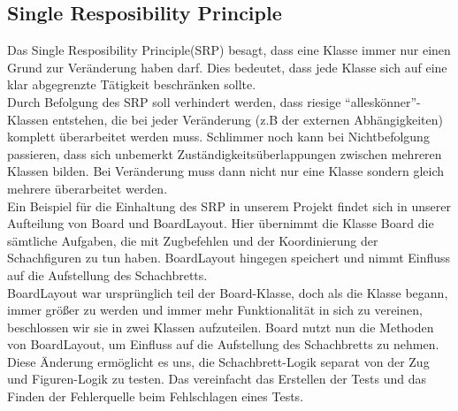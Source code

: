 \documentclass[
10pt, %
a4paper, %
oneside, %
headinclude,footinclude, %
BCOR5mm, %
]{scrartcl}
\begin{document}
\begin{onehalfspace}
\subsection{Single Resposibility Principle}
Das Single Resposibility Principle(SRP) besagt, dass eine Klasse immer nur einen Grund zur Veränderung haben darf. Dies bedeutet, dass jede Klasse sich auf eine klar abgegrenzte Tätigkeit beschränken sollte. 
\\
Durch Befolgung des SRP soll verhindert werden, dass riesige \enquote{alleskönner}-Klassen entstehen, die bei jeder Veränderung (z.B der externen Abhängigkeiten) komplett überarbeitet werden muss. Schlimmer noch kann bei Nichtbefolgung passieren, dass sich unbemerkt Zuständigkeitsüberlappungen zwischen mehreren Klassen bilden. Bei Veränderung muss dann nicht nur eine Klasse sondern gleich mehrere überarbeitet werden.
\\
Ein Beispiel für die Einhaltung des SRP in unserem Projekt findet sich in unserer Aufteilung von Board und BoardLayout. Hier übernimmt die Klasse Board die sämtliche Aufgaben, die mit Zugbefehlen und der Koordinierung der Schachfiguren zu tun haben. BoardLayout hingegen speichert und nimmt Einfluss auf die Aufstellung des Schachbretts.
\\
BoardLayout war ursprünglich teil der Board-Klasse, doch als die Klasse begann, immer größer zu werden und immer mehr Funktionalität in sich zu vereinen, beschlossen wir sie in zwei Klassen aufzuteilen.
Board nutzt nun die Methoden von BoardLayout, um Einfluss auf die Aufstellung des Schachbretts zu nehmen.
\\
Diese Änderung ermöglicht es uns, die Schachbrett-Logik separat von der Zug und Figuren-Logik zu testen. Das vereinfacht das Erstellen der Tests und das Finden der Fehlerquelle beim Fehlschlagen eines Tests.

\end{onehalfspace}
\end{document}
